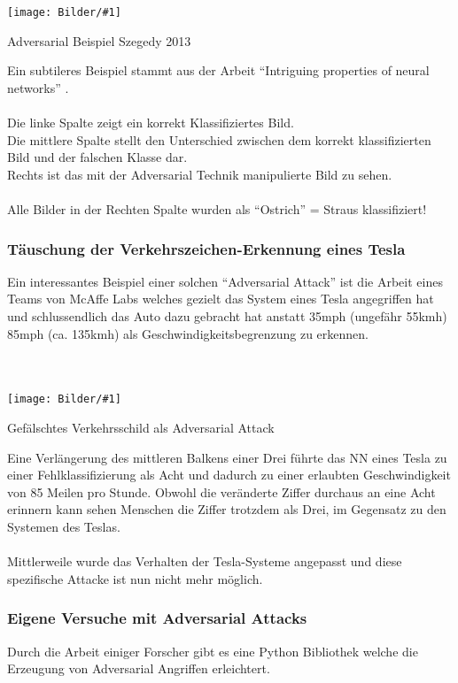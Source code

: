 \documentclass[
  12pt, %
  a4paper, %
  oneside, %
  openany, 
  numbers=noenddot, %
  BCOR=5mm, %
  parskip=half*, %
  thesis, %
]{bfhbook}
\newcommand{\imgText}[3]{
\begin{center}
    \begin{minipage}[t]{0.6\textwidth}
    		\vspace{0pt}
		\texttt{[image: Bilder/\#1]}
		\caption{#2}
	\end{minipage}\hfill
    \begin{minipage}[t]{0.4\textwidth}
    		\vspace{5pt}
  		#3
    \end{minipage}
\end{center}
}
\begin{document}
\imgText{adversarial.png}{Adversarial Beispiel Szegedy 2013}{
Ein subtileres Beispiel stammt aus der Arbeit ``Intriguing properties of neural networks'' \parencite{Szegedy2013}. 
\\\\
Die linke Spalte zeigt ein korrekt Klassifiziertes Bild.
\\
Die mittlere Spalte stellt den Unterschied zwischen dem korrekt klassifizierten Bild und der falschen Klasse dar.
\\
Rechts ist das mit der Adversarial Technik manipulierte Bild zu sehen.
\\
\\
Alle Bilder in der Rechten Spalte wurden als ``Ostrich'' = Straus klassifiziert!
}

\subsubsection*{Täuschung der Verkehrszeichen-Erkennung eines Tesla}
Ein interessantes Beispiel einer solchen ``Adversarial Attack'' ist die Arbeit eines Teams von McAffe Labs welches gezielt das System eines Tesla angegriffen hat und schlussendlich das Auto dazu gebracht hat anstatt 35mph (ungefähr 55kmh)  85mph (ca. 135kmh) als Geschwindigkeitsbegrenzung zu erkennen.\\
\\
\parencite{advTesla} 
\\
\imgText{speed-limit-fake.png}{Gefälschtes Verkehrsschild als Adversarial Attack}{
Eine Verlängerung des mittleren Balkens einer Drei führte das \Gls{NN} eines Tesla zu einer Fehlklassifizierung als Acht und dadurch zu einer erlaubten Geschwindigkeit von 85 Meilen pro Stunde. Obwohl die veränderte Ziffer durchaus an eine Acht erinnern kann sehen Menschen die Ziffer trotzdem als Drei, im Gegensatz zu den Systemen des Teslas.
\\
\\
Mittlerweile wurde das Verhalten der Tesla-Systeme angepasst und diese spezifische Attacke ist nun nicht mehr möglich.
}

\subsubsection*{Eigene Versuche mit Adversarial Attacks}
Durch die Arbeit einiger Forscher \parencite{papernot2018cleverhans} gibt es eine Python Bibliothek \parencite{cleverHans} welche die Erzeugung von Adversarial Angriffen erleichtert.
\end{document}
